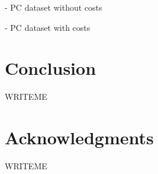 \documentclass{article}
\renewcommand\[{\begin{equation}}
\renewcommand\]{\end{equation}}
\begin{document}
- PC dataset without costs

- PC dataset with costs

\section{Conclusion}

WRITEME

\section*{Acknowledgments}

WRITEME



\end{document}
